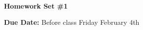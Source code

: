 

\def\ketY{\ensuremath{\ket {\Psi}}}
\def\iGeV{\ensuremath{\textrm{GeV}^{-1}}}
\def\mp{\ensuremath{m_{\textrm{proton}}}}
\def\rp{\ensuremath{r_{\textrm{proton}}}}
\def\me{\ensuremath{m_{\textrm{electron}}}}
\def\aG{\ensuremath{\alpha_G}}
\def\rAtom{\ensuremath{r_{\textrm{atom}}}}
\def\rNucl{\ensuremath{r_{\textrm{nucleus}}}}
\def\GN{\ensuremath{\textrm{G}_\textrm{N}}}



\thispagestyle{fancy}






\begin{center}
{\huge \textbf{Homework Set \#1}}
\large

{\textbf{ Due Date:} Before class Friday February 4th  }
\end{center}

